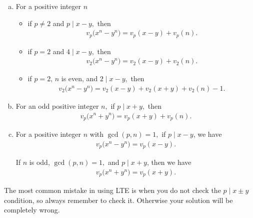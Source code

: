 \documentclass[main.tex]{subfile}
\begin{document}
    \begin{enumerate}[(a)]
        \item  For a positive integer $n$
            \begin{itemize}
                \item if $p \neq 2$ and $p \mid x-y,$ then
                 \begin{align*}
                 v_p\big(  x^n - y^n \big) = v_p(  x - y ) + v_p(  n ).
                 \end{align*}

                \item if $p=2$ and $4 \mid x-y,$ then
                \begin{align*}
                 v_2\big(  x^n - y^n \big) = v_2(  x-y ) + v_2(  n ).
                \end{align*}

                \item if $p=2$, $n$ is even, and $2\mid x-y,$ then
                \begin{align*}
                v_2\big(  x^n - y^n \big) = v_2(  x - y )+v_2(  x + y )+v_2(  n )-1.
                \end{align*}
            \end{itemize}

        \item For an odd positive integer $n,$ if $p \mid x+y,$ then
	            \begin{align*}
                 v_p\big(  x^n + y^n \big) = v_p(  x + y ) + v_p(  n ).
                 \end{align*}

        \item For a positive integer $n$ with $\gcd(p,n)=1,$ if $p\mid x-y$, we have
         \begin{align*}
         v_p\big(  x^n - y^n \big) = v_p(  x - y )  .
         \end{align*}
        \par If $n$ is odd, $\gcd(p,n)=1,$ and $p\mid x+y$, then we have
		\begin{align*}
		v_p\big(  x^n + y^n \big) = v_p(  x + y )  .
		\end{align*}

    \end{enumerate}

    \begin{note}
        The most common mistake in using LTE is when you do not check the $p \mid x \pm y$ condition, so always remember to check it. Otherwise your solution will be completely wrong.
    \end{note}
\end{document}
